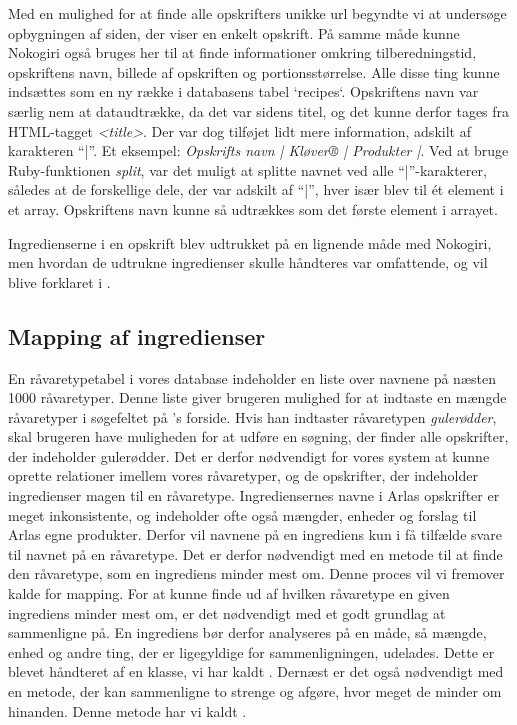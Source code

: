 Med en mulighed for at finde alle opskrifters unikke url begyndte vi at undersøge opbygningen af siden, der viser en enkelt opskrift.
På samme måde kunne Nokogiri også bruges her til at finde informationer omkring tilberedningstid, opskriftens navn, billede af opskriften og portionsstørrelse. Alle disse ting kunne indsættes som en ny række i databasens tabel `recipes`. Opskriftens navn var særlig nem at dataudtrække, da det var sidens titel, og det kunne derfor tages fra HTML-tagget \textit{<title>}. Der var dog tilføjet lidt mere information, adskilt af karakteren ``|''. Et eksempel: \textit{Opskrifts navn | Kløver® | Produkter |}. Ved at bruge Ruby-funktionen \textit{split}\cite{rubydoc}, var det muligt at splitte navnet ved alle ``|''-karakterer, således at de forskellige dele, der var adskilt af ``|'', hver især blev til ét element i et array. Opskriftens navn kunne så udtrækkes som det første element i arrayet.

Ingredienserne i en opskrift blev udtrukket på en lignende måde med Nokogiri, men hvordan de udtrukne ingredienser skulle håndteres var omfattende, og vil blive forklaret i .

\subsection{Mapping af ingredienser}
\label{sec:mapping}
En råvaretypetabel i vores database indeholder en liste over navnene på næsten 1000 råvaretyper. Denne liste giver brugeren mulighed for at indtaste en mængde råvaretyper i søgefeltet på \Foodl{}'s forside. Hvis han indtaster råvaretypen \textit{gulerødder}, skal brugeren have muligheden for at udføre en søgning, der finder alle opskrifter, der indeholder gulerødder. Det er derfor nødvendigt for vores system at kunne oprette relationer imellem vores råvaretyper, og de opskrifter, der indeholder ingredienser magen til en råvaretype. Ingrediensernes navne i Arlas opskrifter er meget inkonsistente, og indeholder ofte også mængder, enheder og forslag til Arlas egne produkter. Derfor vil navnene på en ingrediens kun i få tilfælde svare til navnet på en råvaretype. Det er derfor nødvendigt med en metode til at finde den råvaretype, som en ingrediens minder mest om. Denne proces vil vi fremover kalde for mapping. For at kunne finde ud af hvilken råvaretype en given ingrediens minder mest om, er det nødvendigt med et godt grundlag at sammenligne på. En ingrediens bør derfor analyseres på en måde, så mængde, enhed og andre ting, der er ligegyldige for sammenligningen, udelades. Dette er blevet håndteret af en klasse, vi har kaldt . Dernæst er det også nødvendigt med en metode, der kan sammenligne to strenge og afgøre, hvor meget de minder om hinanden. Denne metode har vi kaldt .

